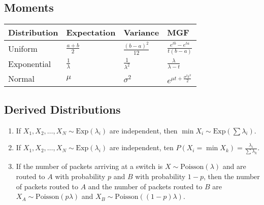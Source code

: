 \subsection*{Moments}
\begin{center}
  \begin{tabularx}{\textwidth}{XXXX}
	\toprule
	Distribution & Expectation & Variance & MGF\\
	\midrule
	Uniform & $\frac{a+b}{2}$ & $\frac{(b-a)^2}{12}$ & $\frac{e^{tb}-e^{ta}}{t(b-a)}$\\
	Exponential & $\frac{1}{\lambda}$ & $\frac{1}{\lambda^2}$ & $\frac{\lambda}{\lambda - t}$\\
	Normal & $\mu$ & $\sigma^2$ & $e^{\mu t + \frac{\sigma^2t^2}{2}}$
  \end{tabularx}
\end{center}
\subsection*{Derived Distributions}
\begin{enumerate}
  \item If $X_1, X_2, \dots, X_N \sim \text{Exp}(\lambda_i)$ are independent, then $\min X_i \sim \text{Exp}(\sum \lambda_i)$.
  \item If $X_1, X_2, \dots, X_N \sim \text{Exp}(\lambda_i)$ are independent, ten $P(X_i = \min X_k) = \frac{\lambda_i}{\sum \lambda_k}$.
  \item If the number of packets arriving at a switch is $X\sim\text{Poisson}(\lambda)$ and are routed to $A$ with probability $p$ and $B$ with probability $1-p$, then the number of packets routed to $A$ and the number of packets routed to $B$ are $X_A\sim\text{Poisson}(p\lambda)$ and $X_B\sim\text{Poisson}((1-p)\lambda)$.
\end{enumerate}

